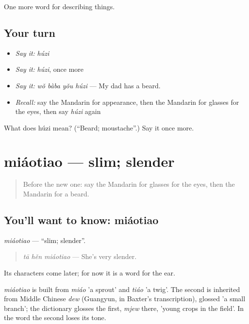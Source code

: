 \begin{grammarlens}[title={What you've built}]
One more word for describing things.
\end{grammarlens}

\subsection*{Your turn}
\begin{itemize}
\raggedright
  \item \emph{Say it:} \emph{húzi}
  \item \emph{Say it:} \emph{húzi}, once more
  \item \emph{Say it:} \emph{wǒ bàba yǒu húzi} — My dad has a beard.
  \item \emph{Recall:} say the Mandarin for appearance, then the Mandarin for glasses for the eyes, then say \emph{húzi} again
\end{itemize}

\begin{tcolorbox}[breakable,colback=teal!4,colframe=teal!35!black,title={Before you move on}]
What does húzi mean? (\textquotedblleft{}Beard; moustache\textquotedblright{}.) Say it once more.
\end{tcolorbox}
\section[miáotiao]{miáotiao — slim; slender}

\label{lesson:ZH-C233-miaotiao}



\begin{quote}
Before the new one: say the Mandarin for glasses for the eyes, then the Mandarin for a beard.
\end{quote}

\subsection*{You'll want to know: miáotiao}
\emph{miáotiao} — \textquotedblleft{}slim; slender\textquotedblright{}.

\begin{quote}
\emph{tā hěn miáotiao} — She's very slender.
\end{quote}

Its characters come later; for now it is a word for the ear.

\begin{cousinweb}
\emph{miáotiao} is built from \emph{miáo} 'a sprout' and \emph{tiáo} 'a twig'. The second is inherited from Middle Chinese \emph{dew} (Guangyun, in Baxter's transcription), glossed 'a small branch'; the dictionary glosses the first, \emph{mjew} there, 'young crops in the field'. In the word the second loses its tone.
\end{cousinweb}

